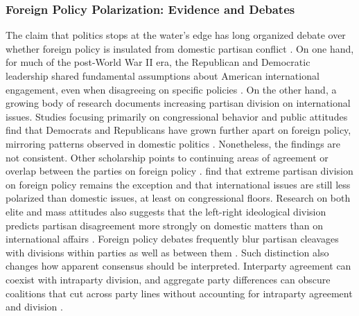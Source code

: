 \subsubsection{Foreign Policy Polarization: Evidence and Debates}

The claim that politics stops at the water's edge has long organized debate over whether foreign policy is insulated from domestic partisan conflict \citep{kupchanDeadCenterDemise2007}. On one hand, for much of the post-World War II era, the Republican and Democratic leadership shared fundamental assumptions about American international engagement, even when disagreeing on specific policies \citep{smeltzAreWeDrowning2022}. On the other hand, a growing body of research documents increasing partisan division on international issues. Studies focusing primarily on congressional behavior and public attitudes find that Democrats and Republicans have grown further apart on foreign policy, mirroring patterns observed in domestic politics \citep{delaetTreatyMakingPartisanPolitics2006,jeongDivisionWatersEdge2019,kupchanDeadCenterDemise2007,schultzPerilsPolarizationUS2017,smeltzAreWeDrowning2022,snyderFreeHandAbroad2009}. Nonetheless, the findings are not consistent. Other scholarship points to continuing areas of agreement or overlap between the parties on foreign policy \citep{busbyComingTogetherComing2020,chaudoinNotOutLiberal2018,scottNotSoSilentPartnerPatterns2014}. \citet{bryanPrevalenceBipartisanshipUS2022} find that extreme partisan division on foreign policy remains the exception and that international issues are still less polarized than domestic issues, at least on congressional floors. Research on both elite and mass attitudes also suggests that the left-right ideological division predicts partisan disagreement more strongly on domestic matters than on international affairs \citep{baldassarriPartisansConstraintPolitical2008a,noelPoliticalIdeologiesPolitical2014}. Foreign policy debates frequently blur partisan cleavages with divisions within parties as well as between them \citep{pratherValuesWatersEdge2014,rathbunWedgesWidgetsLiberalism2016}. Such distinction also changes how apparent consensus should be interpreted. Interparty agreement can coexist with intraparty division, and aggregate party differences can obscure coalitions that cut across party lines without accounting for intraparty agreement and division \citep{friedrichsPolarizationUSForeign2022}.

